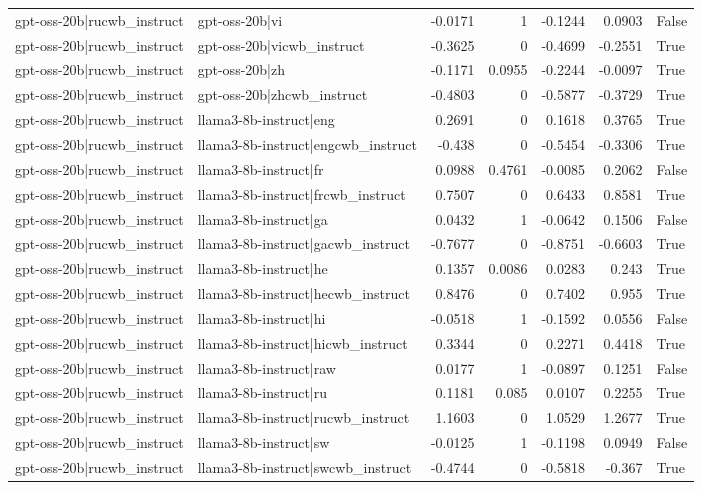 \begin{table}
\begin{tabular}{l l r r r r l}
gpt-oss-20b|rucwb_instruct & gpt-oss-20b|vi & -0.0171 & 1 & -0.1244 & 0.0903 & False \\
gpt-oss-20b|rucwb_instruct & gpt-oss-20b|vicwb_instruct & -0.3625 & 0 & -0.4699 & -0.2551 & True \\
gpt-oss-20b|rucwb_instruct & gpt-oss-20b|zh & -0.1171 & 0.0955 & -0.2244 & -0.0097 & True \\
gpt-oss-20b|rucwb_instruct & gpt-oss-20b|zhcwb_instruct & -0.4803 & 0 & -0.5877 & -0.3729 & True \\
gpt-oss-20b|rucwb_instruct & llama3-8b-instruct|eng & 0.2691 & 0 & 0.1618 & 0.3765 & True \\
gpt-oss-20b|rucwb_instruct & llama3-8b-instruct|engcwb_instruct & -0.438 & 0 & -0.5454 & -0.3306 & True \\
gpt-oss-20b|rucwb_instruct & llama3-8b-instruct|fr & 0.0988 & 0.4761 & -0.0085 & 0.2062 & False \\
gpt-oss-20b|rucwb_instruct & llama3-8b-instruct|frcwb_instruct & 0.7507 & 0 & 0.6433 & 0.8581 & True \\
gpt-oss-20b|rucwb_instruct & llama3-8b-instruct|ga & 0.0432 & 1 & -0.0642 & 0.1506 & False \\
gpt-oss-20b|rucwb_instruct & llama3-8b-instruct|gacwb_instruct & -0.7677 & 0 & -0.8751 & -0.6603 & True \\
gpt-oss-20b|rucwb_instruct & llama3-8b-instruct|he & 0.1357 & 0.0086 & 0.0283 & 0.243 & True \\
gpt-oss-20b|rucwb_instruct & llama3-8b-instruct|hecwb_instruct & 0.8476 & 0 & 0.7402 & 0.955 & True \\
gpt-oss-20b|rucwb_instruct & llama3-8b-instruct|hi & -0.0518 & 1 & -0.1592 & 0.0556 & False \\
gpt-oss-20b|rucwb_instruct & llama3-8b-instruct|hicwb_instruct & 0.3344 & 0 & 0.2271 & 0.4418 & True \\
gpt-oss-20b|rucwb_instruct & llama3-8b-instruct|raw & 0.0177 & 1 & -0.0897 & 0.1251 & False \\
gpt-oss-20b|rucwb_instruct & llama3-8b-instruct|ru & 0.1181 & 0.085 & 0.0107 & 0.2255 & True \\
gpt-oss-20b|rucwb_instruct & llama3-8b-instruct|rucwb_instruct & 1.1603 & 0 & 1.0529 & 1.2677 & True \\
gpt-oss-20b|rucwb_instruct & llama3-8b-instruct|sw & -0.0125 & 1 & -0.1198 & 0.0949 & False \\
gpt-oss-20b|rucwb_instruct & llama3-8b-instruct|swcwb_instruct & -0.4744 & 0 & -0.5818 & -0.367 & True \\

\end{tabular}
\end{table}
